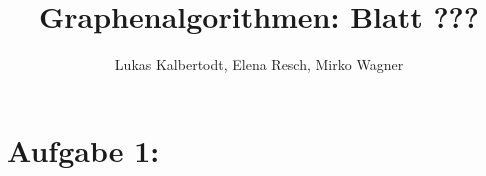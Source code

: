 \documentclass[11pt]{scrartcl} %
\title{Graphenalgorithmen: Blatt ???}
\author{Lukas Kalbertodt, Elena Resch, Mirko Wagner}
\begin{document}
\maketitle


\section*{Aufgabe 1:}
\end{document}
